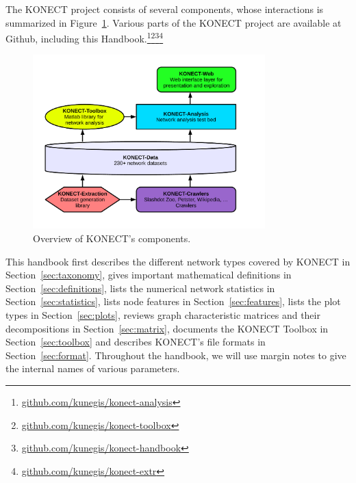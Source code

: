 \documentclass{article}
\newcommand{\wOnePointFive}{0.8\textwidth}
\begin{document}
The KONECT project consists of several components, whose interactions is
summarized in Figure~\ref{fig:organization}.  Various parts of the
KONECT project are available at Github, including this Handbook.\footnote{\href{https://github.com/kunegis/konect-analysis}{github.com/kunegis/konect-analysis}}\footnote{\href{https://github.com/kunegis/konect-toolbox}{github.com/kunegis/konect-toolbox}}\footnote{\href{https://github.com/kunegis/konect-handbook}{github.com/kunegis/konect-handbook}}\footnote{\href{https://github.com/kunegis/konect-extr}{github.com/kunegis/konect-extr}}

\begin{figure}
  \centering
  \includegraphics[width=\wOnePointFive]{organization.white}
  \caption{
    \label{fig:organization}
    Overview of KONECT's components. 
  }
\end{figure}

This handbook first 
describes the different network types covered by KONECT in
Section~\ref{sec:taxonomy}, 
gives important mathematical definitions in
Section~\ref{sec:definitions},  
lists the numerical network statistics in Section~\ref{sec:statistics},
lists node features in Section~\ref{sec:features},
lists the plot types in Section~\ref{sec:plots}, 
reviews graph characteristic matrices and their decompositions in
Section~\ref{sec:matrix},  
documents the KONECT Toolbox in
Section~\ref{sec:toolbox} and
describes KONECT's file formats in Section~\ref{sec:format}. 
Throughout the handbook, we will use margin notes to give the internal
names of various parameters. 
\end{document}
